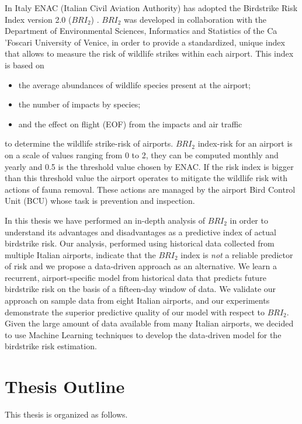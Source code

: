 In Italy ENAC (Italian Civil Aviation Authority) has adopted the Birdstrike Risk Index version 2.0 ($BRI_2$) \cite{soldatini2011wildlife}. $BRI_2$ was developed in collaboration with the Department of Environmental Sciences, Informatics and Statistics of the Ca 'Foscari University of Venice, in order to provide a standardized, unique index that allows to measure the risk of wildlife strikes within each airport.
This index is based on
\begin{itemize}
\item the average abundances of wildlife species present at the  airport;
\item the number of impacts by species;
\item and the effect on flight (EOF) from the impacts and air traffic
\end{itemize}
to determine the wildlife strike-risk of airports.
$BRI_2$ index-risk for an airport is on a scale of values ranging from 0 to 2, they can be computed monthly and yearly and 0.5 is the threshold value chosen by ENAC. If the risk index is bigger than this threshold value the airport operates to mitigate the wildlife risk with actions of fauna removal. These actions are managed by the airport Bird Control Unit (BCU) whose task is prevention and inspection. 

In this thesis we have performed an in-depth analysis of $BRI_2$ in order to understand its advantages and disadvantages as a predictive index of actual birdstrike risk. Our analysis, performed using historical data collected from multiple Italian airports, indicate that the $BRI_2$ index is \emph{not} a reliable predictor of risk and we propose a data-driven approach as an alternative. We learn a recurrent, airport-specific model from historical data that predicts future birdstrike risk on the basis of a fifteen-day window of data. We validate our approach on sample data from eight Italian airports, and our experiments demonstrate the superior predictive quality of our model with respect to $BRI_2$.   
Given the large amount of data available from many Italian airports, we decided to use Machine Learning techniques to develop the data-driven model for the birdstrike risk estimation.

\section{Thesis Outline}

This thesis is organized as follows.


